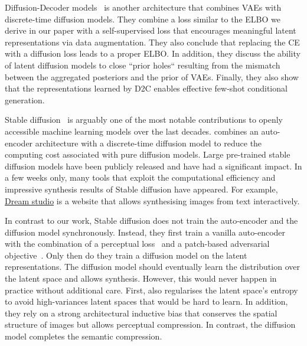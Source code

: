 Diffusion-Decoder models~\citep[][D2C]{sinha2021d2c} is another architecture that combines VAEs with discrete-time diffusion models. They combine a loss similar to the ELBO we derive in our paper with a self-supervised loss that encourages meaningful latent representations via data augmentation. They also conclude that replacing the CE with a diffusion loss leads to a proper ELBO. In addition, they discuss the ability of latent diffusion models to close ``prior holes`` resulting from the mismatch between the aggregated posteriors and the prior of VAEs. Finally, they also show that the representations learned by D2C enables effective few-shot conditional generation.

Stable diffusion~\citep{rombach2022high} is arguably one of the most notable contributions to openly accessible machine learning models over the last decades. \citet{rombach2022high} combines an auto-encoder architecture with a discrete-time diffusion model to reduce the computing cost associated with pure diffusion models. Large pre-trained stable diffusion models have been publicly released and have had a significant impact. In a few weeks only, many tools that exploit the computational efficiency and impressive synthesis results of Stable diffusion have appeared. For example, \href{https://beta.dreamstudio.ai/}{Dream studio} is a website that allows synthesising images from text interactively.

In contrast to our work, Stable diffusion does not train the auto-encoder and the diffusion model synchronously. Instead, they first train a vanilla auto-encoder with the combination of a perceptual loss~\citep{zhang2018unreasonable} and a patch-based adversarial objective~\citep{dosovitskiy2016generating, esser2021taming, yu2021vector}. Only then do they train a diffusion model on the latent representations. The diffusion model should eventually learn the distribution over the latent space and allows synthesis. However, this would never happen in practice without additional care. First, \citet{rombach2022high} also regularises the latent space's entropy to avoid high-variances latent spaces that would be hard to learn. In addition, they rely on a strong architectural inductive bias that conserves the spatial structure of images but allows perceptual compression. In contrast, the diffusion model completes the semantic compression.

